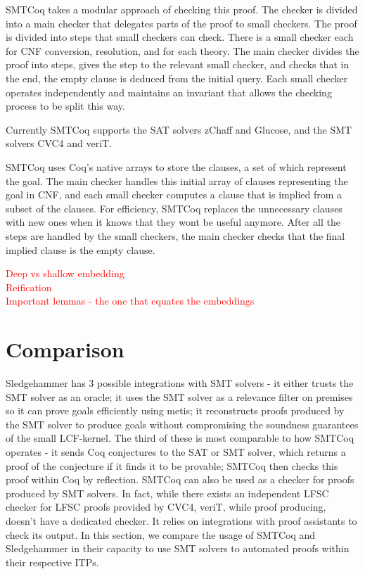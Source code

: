 \documentclass{article}
\begin{document}
	
	SMTCoq takes a modular approach of checking this proof.
	The checker is divided into a main checker that 
	delegates parts of the proof to small checkers. The proof 
	is divided into steps that small checkers can check.
	There is a small checker each for CNF conversion, 
	resolution, and for each theory. The main checker divides the 
	proof into steps, gives the step to the relevant small 
	checker, and checks that in the end, the empty 
	clause is deduced from the initial query. Each small 
	checker operates independently and maintains an invariant
	that allows the checking process to be split this way.
	
	Currently SMTCoq supports the SAT solvers zChaff and Glucose, 
	and the SMT solvers CVC4 and veriT. 
	
	SMTCoq uses Coq's native arrays to store the clauses, 
	a set of which represent the goal. The main checker 
	handles this initial array of clauses representing the 
	goal in CNF, and each small checker computes a 
	clause that is implied from a subset of the clauses.
	For efficiency, SMTCoq replaces the unnecessary 
	clauses with new ones when it knows that they 
	wont be useful anymore. After all the steps 
	are handled by the small checkers, the main 
	checker checks that the final implied clause is 
	the empty clause.
	
	\textcolor{red}{Deep vs shallow embedding}\\
	\textcolor{red}{Reification}\\
	\textcolor{red}{Important lemmas - the one that equates the embeddings}\\
	
\section{Comparison}
\label{sec:comp}
	Sledgehammer has 3 possible integrations with SMT solvers - 
	it either trusts the SMT solver as an oracle; it uses the 
	SMT solver as a relevance filter on premises so it can 
	prove goals efficiently using metis; it reconstructs 
	proofs produced by the SMT solver to produce goals 
	without compromising the soundness guarantees of the 
	small LCF-kernel. The third of these is most comparable 
	to how SMTCoq operates - it sends Coq conjectures to the 
	SAT or SMT solver, which returns a proof of the conjecture 
	if it finds it to be provable; SMTCoq then checks this 
	proof within Coq by reflection. SMTCoq can also be used as a 
	checker for proofs produced by SMT solvers. In fact, while 
	there exists an independent LFSC checker for LFSC proofs 
	provided by CVC4, veriT, while proof producing, doesn't 
	have a dedicated checker. It relies on integrations with 
	proof assistants to check its output. In this section, we 
	compare the usage of SMTCoq and Sledgehammer in their 
	capacity to use SMT solvers to automated proofs within 
	their respective ITPs.
	
\end{document}
